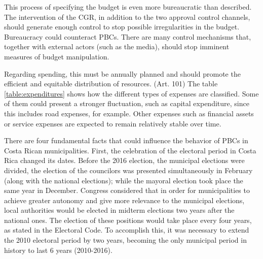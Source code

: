 This process of specifying the budget is even more bureaucratic than described. The intervention of the CGR, in addition to the two approval control channels, should generate enough control to stop possible irregularities in the budget. Bureaucracy could counteract PBCs. There are many control mechanisms that, together with external actors (such as the media), should stop imminent measures of budget manipulation. 



Regarding spending, this must be annually planned and should promote the efficient and equitable distribution of resources. (Art. 101) The table \ref{table:expenditures} shows how the different types of expenses are classified. Some of them could present a stronger fluctuation, such as capital expenditure, since this includes road expenses, for example. Other expenses such as financial assets or service expenses are expected to remain relatively stable over time.

There are four fundamental facts that could influence the behavior of PBCs in Costa Rican municipalities. First, the celebration of the electoral period in Costa Rica changed its dates. Before the 2016 election, the municipal elections were divided, the election of the councilors was presented simultaneously in February (along with the national elections); while the mayoral election took place the same year in December. Congress considered that in order for municipalities to achieve greater autonomy and give more relevance to the municipal elections, local authorities would be elected in midterm elections two years after the national ones. The election of these positions would take place every four years, as stated in the Electoral Code. \parencite[Art. 150]{al2009} To accomplish this, it was necessary to extend the 2010 electoral period by two years, becoming the only municipal period in history to last 6 years (2010-2016). 

